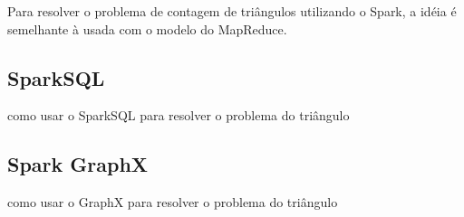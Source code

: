 Para resolver o problema de contagem de triângulos utilizando o Spark, a idéia é semelhante à usada com o modelo do MapReduce.

\subsection{SparkSQL}
como usar o SparkSQL para resolver o problema do triângulo
\subsection{Spark GraphX}
como usar o GraphX para resolver o problema do triângulo

